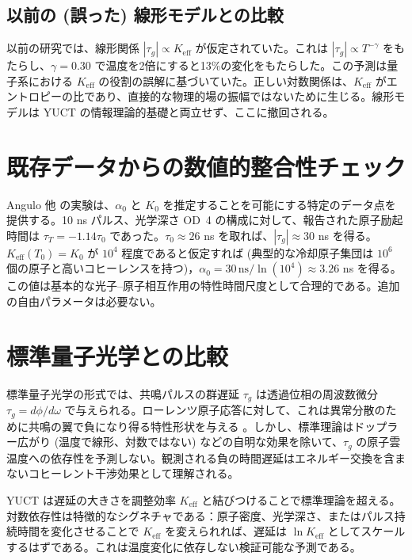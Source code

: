 \documentclass[12pt,a4paper]{article}
\newcommand{\Keff}{K_{\mathrm{eff}}}
\begin{document}
	\subsection{以前の (誤った) 線形モデルとの比較}
	
	以前の研究では、線形関係 \(|\tau_g| \propto \Keff\) が仮定されていた。これは \(|\tau_g| \propto T^{-\gamma}\) をもたらし、\(\gamma = 0.30\) で温度を2倍にすると13\%の変化をもたらした。この予測は量子系における \(\Keff\) の役割の誤解に基づいていた。正しい対数関係は、\(\Keff\) がエントロピーの比であり、直接的な物理的場の振幅ではないために生じる。線形モデルは YUCT の情報理論的基礎と両立せず、ここに撤回される。
	
	\section{既存データからの数値的整合性チェック}
	
	Angulo 他 \cite{Angulo2024} の実験は、\(\alpha_0\) と \(K_0\) を推定することを可能にする特定のデータ点を提供する。10 ns パルス、光学深さ OD~4 の構成に対して、報告された原子励起時間は \(\tau_T = -1.14 \tau_0\) であった。\(\tau_0 \approx 26\) ns を取れば、\(|\tau_g| \approx 30\) ns を得る。\(\Keff(T_0) = K_0\) が \(10^4\) 程度であると仮定すれば (典型的な冷却原子集団は \(10^6\) 個の原子と高いコヒーレンスを持つ)，\(\alpha_0 = 30\,\text{ns} / \ln(10^4) \approx 3.26\) ns を得る。この値は基本的な光子–原子相互作用の特性時間尺度として合理的である。追加の自由パラメータは必要ない。
	
	\section{標準量子光学との比較}
	
	標準量子光学の形式では、共鳴パルスの群遅延 \(\tau_g\) は透過位相の周波数微分 \(\tau_g = d\phi/d\omega\) で与えられる。ローレンツ原子応答に対して、これは異常分散のために共鳴の翼で負になり得る特性形状を与える \cite{Milonni2004}。しかし、標準理論はドップラー広がり (温度で線形、対数ではない) などの自明な効果を除いて、\(\tau_g\) の原子雲温度への依存性を予測しない。観測される負の時間遅延はエネルギー交換を含まないコヒーレント干渉効果として理解される。
	
	YUCT は遅延の大きさを調整効率 \(\Keff\) と結びつけることで標準理論を超える。対数依存性は特徴的なシグネチャである：原子密度、光学深さ、またはパルス持続時間を変化させることで \(\Keff\) を変えられれば、遅延は \(\ln\Keff\) としてスケールするはずである。これは温度変化に依存しない検証可能な予測である。
	
\end{document}

